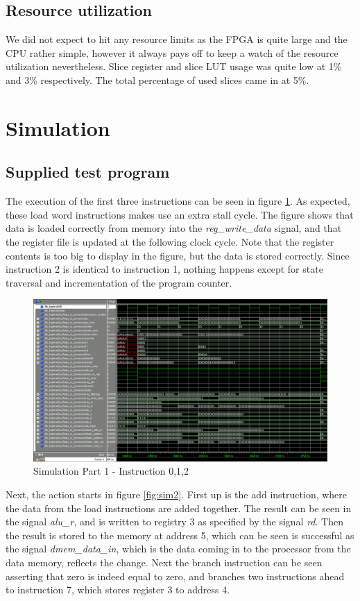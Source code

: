 \subsection{Resource utilization}
We did not expect to hit any resource limits as the FPGA is quite large and the CPU rather simple, however it always pays off to keep a watch of the resource utilization nevertheless.
Slice register and slice LUT usage was quite low at 1\% and 3\% respectively.
The total percentage of used slices came in at 5\%.

\section{Simulation}
\subsection{Supplied test program}
The execution of the first three instructions can be seen in figure \ref{fig:sim1}. As expected, these load word instructions makes use an extra stall cycle. The figure shows that data is loaded correctly from memory into the \emph{reg_write_data} signal, and that the register file is updated at the following clock cycle. Note that the register contents is too big to display in the figure, but the data is stored correctly. Since instruction 2 is identical to instruction 1, nothing happens except for state traversal and incrementation of the program counter.
\begin{figure}[ht]
    \centering
    \includegraphics[scale=0.36]{figures/sim1.png}
    \caption{\label{fig:sim1}Simulation Part 1 - Instruction 0,1,2}
\end{figure}

Next, the action starts in figure \ref{fig:sim2}. First up is the add instruction, where the data from the load instructions are added together. The result can be seen in the signal \emph{alu_r}, and is written to registry 3 as specified by the signal \emph{rd}. Then the result is stored to the memory at address 5, which can be seen is successful as the signal \emph{dmem_data_in}, which is the data coming in to the processor from the data memory, reflects the change. Next the branch instruction can be seen asserting that zero is indeed equal to zero, and branches two instructions ahead to instruction 7, which stores register 3 to address 4.

